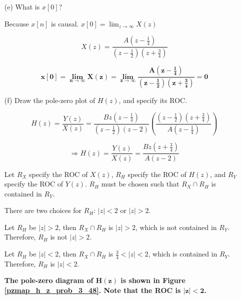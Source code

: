 \documentclass[fleqn]{article}
\begin{document}
\begin{enumerate}[nolistsep]
\begin{enumerate} [nolistsep]
						\textbf{Because $\mathbf{X(z)}$ does not have a pole at $\mathbf{z = \infty}$, $\mathbf{x[n]}$ must be causal.}
					
					\pagebreak	
					\item[(e)] What is $x[0]$?
					
						Because $x[n]$ is causal. $x[0] = \displaystyle\lim_{z\to\infty}{X(z)}$
						
						\begin{equation*}
							X(z) = \frac{A\left(z - \frac{1}{4}\right)}{\left(z - \frac{1}{2}\right)\left(z + \frac{3}{4}\right)}
						\end{equation*}
						
						\begin{equation*}
							\mathbf{x[0] = \displaystyle\lim_{n\to\infty}{X(z)} = \displaystyle\lim_{z\to\infty}{\frac{A\left(z - \frac{1}{4}\right)}{\left(z - \frac{1}{2}\right)\left(z + \frac{3}{4}\right)}} = 0}
						\end{equation*}
							
					\item[(f)] Draw the pole-zero plot of $H(z)$, and specify its ROC.
					
					\begin{equation*}
						H(z) = \frac{Y(z)}{X(z)} = \frac{Bz\left(z - \frac{1}{4}\right)}{\left(z - \frac{1}{2}\right)\left(z - 2\right)}\left(\frac{\left(z - \frac{1}{2}\right)\left(z + \frac{3}{4}\right)}{A\left(z - \frac{1}{4}\right)}\right)
					\end{equation*}
					
					\begin{equation*}
						\Rightarrow H(z) = \frac{Y(z)}{X(z)} = \frac{Bz\left(z + \frac{3}{4}\right)}{A\left(z - 2\right)}
					\end{equation*}
					
					Let $R_X$ specify the ROC of $X(z)$, $R_H$ specify the ROC of $H(z)$, and $R_Y$ specify the ROC of $Y(z)$. $R_H$ must be chosen such that $R_X \cap R_H$ is contained in $R_Y$. 
					
					There are two choices for $R_H$: $|z| < 2$ or $|z| > 2$.
					
					Let $R_H$ be $|z| > 2$, then $R_X \cap R_H$ is $|z| > 2$, which is not contained in $R_Y$. Therefore, $R_H$ is not $|z| > 2$.
					
					Let $R_H$ be $|z| < 2$, then $R_X \cap R_H$ is $\frac{3}{4} < |z| < 2$, which is contained in $R_Y$. Therefore, $R_H$ is $|z| < 2$.
					
					\textbf{The pole-zero diagram of $\mathbf{H(z)}$ is shown in Figure \ref{pzmap_h_z_prob_3_48}. Note that the ROC is $\mathbf{|z| < 2}$.}
					

\end{enumerate}
\end{enumerate}
\end{document}
